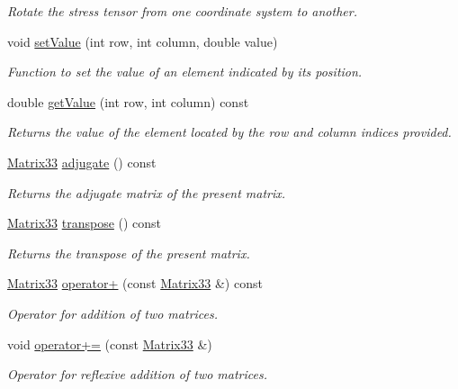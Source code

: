 \begin{DoxyCompactItemize}
\begin{DoxyCompactList}\small\item\em Rotate the stress tensor from one coordinate system to another. \end{DoxyCompactList}\item 
void \hyperlink{classMatrix33_a6cdcec77fd089b2e73ad7ae85ecff30b}{set\-Value} (int row, int column, double value)
\begin{DoxyCompactList}\small\item\em Function to set the value of an element indicated by its position. \end{DoxyCompactList}\item 
double \hyperlink{classMatrix33_ab53b3e37ad830a87a804cf26311ba088}{get\-Value} (int row, int column) const 
\begin{DoxyCompactList}\small\item\em Returns the value of the element located by the row and column indices provided. \end{DoxyCompactList}\item 
\hyperlink{classMatrix33}{Matrix33} \hyperlink{classMatrix33_a07b999a7b1c905f3c98ba3792e6fa33f}{adjugate} () const 
\begin{DoxyCompactList}\small\item\em Returns the adjugate matrix of the present matrix. \end{DoxyCompactList}\item 
\hyperlink{classMatrix33}{Matrix33} \hyperlink{classMatrix33_a64418c1a8836b38526fdfd7ffcc79cfd}{transpose} () const 
\begin{DoxyCompactList}\small\item\em Returns the transpose of the present matrix. \end{DoxyCompactList}\item 
\hyperlink{classMatrix33}{Matrix33} \hyperlink{classMatrix33_adc58ec5739c9250ff1150c725d0e868e}{operator+} (const \hyperlink{classMatrix33}{Matrix33} \&) const 
\begin{DoxyCompactList}\small\item\em Operator for addition of two matrices. \end{DoxyCompactList}\item 
void \hyperlink{classMatrix33_acb59e59d3937e075521f478ba83b7165}{operator+=} (const \hyperlink{classMatrix33}{Matrix33} \&)
\begin{DoxyCompactList}\small\item\em Operator for reflexive addition of two matrices. \end{DoxyCompactList}\item 

\end{DoxyCompactItemize}
